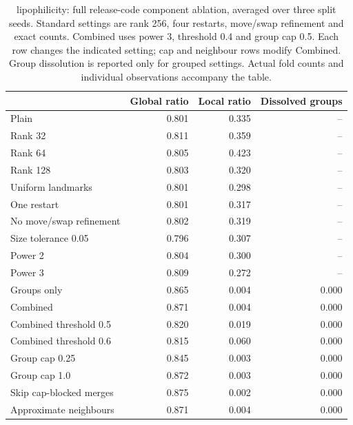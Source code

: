 \begin{table}[htbp]\centering\small
\begin{tabular}{lrrr}
\toprule
 & Global ratio & Local ratio & Dissolved groups \\
\midrule
Plain & 0.801 & 0.335 & -- \\
Rank 32 & 0.811 & 0.359 & -- \\
Rank 64 & 0.805 & 0.423 & -- \\
Rank 128 & 0.803 & 0.320 & -- \\
Uniform landmarks & 0.801 & 0.298 & -- \\
One restart & 0.801 & 0.317 & -- \\
No move/swap refinement & 0.802 & 0.319 & -- \\
Size tolerance 0.05 & 0.796 & 0.307 & -- \\
Power 2 & 0.804 & 0.300 & -- \\
Power 3 & 0.809 & 0.272 & -- \\
Groups only & 0.865 & 0.004 & 0.000 \\
Combined & 0.871 & 0.004 & 0.000 \\
Combined threshold 0.5 & 0.820 & 0.019 & 0.000 \\
Combined threshold 0.6 & 0.815 & 0.060 & 0.000 \\
Group cap 0.25 & 0.845 & 0.003 & 0.000 \\
Group cap 1.0 & 0.872 & 0.003 & 0.000 \\
Skip cap-blocked merges & 0.875 & 0.002 & 0.000 \\
Approximate neighbours & 0.871 & 0.004 & 0.000 \\
\bottomrule
\end{tabular}

\caption{lipophilicity: full release-code component ablation, averaged over three split seeds. Standard settings are rank 256, four restarts, move/swap refinement and exact counts. Combined uses power 3, threshold 0.4 and group cap 0.5. Each row changes the indicated setting; cap and neighbour rows modify Combined. Group dissolution is reported only for grouped settings. Actual fold counts and individual observations accompany the table.}\end{table}
